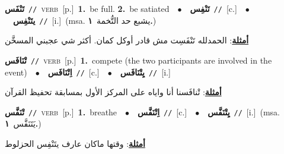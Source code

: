 \documentclass[10pt,a4paper,twoside]{article} %
\begin{document}
\begin{multicols}{2}
{\setlength\topsep{0pt}\textbf{\foreignlanguage{arabic}{تَنْفَس}}\ {\color{gray}\texttt{//}\color{black}}\ \textsc{verb}\ [p.]\ \textbf{1.}~be full.  \textbf{2.}~be satiated\ \ $\bullet$\ \ \setlength\topsep{0pt}\textbf{\foreignlanguage{arabic}{تَنْفِس}}\ {\color{gray}\texttt{//}\color{black}}\ [c.]\ \ $\bullet$\ \ \setlength\topsep{0pt}\textbf{\foreignlanguage{arabic}{يتَنْفِس}}\ {\color{gray}\texttt{//}\color{black}}\ [i.]\ \color{gray}(msa. \foreignlanguage{arabic}{يشبع حد التُّخمة}~\foreignlanguage{arabic}{\textbf{١.}})\color{black}\  \begin{flushright}\color{gray}\foreignlanguage{arabic}{\textbf{\underline{\foreignlanguage{arabic}{أمثلة}}}: الحمدلله تَنْفَسِت مش قادر أوكل كمان. أكثر شي عجبني المسخَّن}\end{flushright}\color{black}} \vspace{2mm}

{\setlength\topsep{0pt}\textbf{\foreignlanguage{arabic}{تْنَافَس}}\ {\color{gray}\texttt{//}\color{black}}\ \textsc{verb}\ [p.]\ \textbf{1.}~compete (the two participants are involved in the event)\ \ $\bullet$\ \ \setlength\topsep{0pt}\textbf{\foreignlanguage{arabic}{اِتْنَافَس}}\ {\color{gray}\texttt{//}\color{black}}\ [c.]\ \ $\bullet$\ \ \setlength\topsep{0pt}\textbf{\foreignlanguage{arabic}{يِتْنَافَس}}\ {\color{gray}\texttt{//}\color{black}}\ [i.]\  \begin{flushright}\color{gray}\foreignlanguage{arabic}{\textbf{\underline{\foreignlanguage{arabic}{أمثلة}}}: تْنافَسنا أنا واياه على المركز الأول بمسابقة تحفيظ القرآن}\end{flushright}\color{black}} \vspace{2mm}

{\setlength\topsep{0pt}\textbf{\foreignlanguage{arabic}{تْنَفَّس}}\ {\color{gray}\texttt{//}\color{black}}\ \textsc{verb}\ [p.]\ \textbf{1.}~breathe\ \ $\bullet$\ \ \setlength\topsep{0pt}\textbf{\foreignlanguage{arabic}{اِتْنَفَّس}}\ {\color{gray}\texttt{//}\color{black}}\ [c.]\ \ $\bullet$\ \ \setlength\topsep{0pt}\textbf{\foreignlanguage{arabic}{يِتْنَفَّس}}\ {\color{gray}\texttt{//}\color{black}}\ [i.]\ \color{gray}(msa. \foreignlanguage{arabic}{يَتَنَفَّس}~\foreignlanguage{arabic}{\textbf{١.}})\color{black}\  \begin{flushright}\color{gray}\foreignlanguage{arabic}{\textbf{\underline{\foreignlanguage{arabic}{أمثلة}}}: وقتها ماكان عارف يتَنْفِس الحزلوط}\end{flushright}\color{black}} \vspace{2mm}


\end{multicols}
\end{document}
